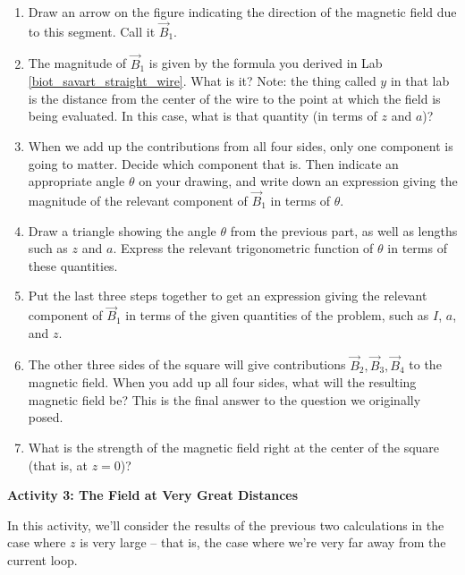 \begin{enumerate}[labparts]

\item Draw an arrow on the figure indicating the 
direction of the magnetic field due to this segment.
Call it $\vec{B}_1$.

\item The magnitude of $\vec{B}_1$ is given by the formula
you derived in Lab \ref{biot_savart_straight_wire}. What is it? Note: the thing
called $y$ in that lab is the distance from the center of
the wire to the point at which the field is being evaluated. 
In this case, what is that quantity (in terms of $z$ and $a$)?
\answerspace{0.7in}

\item When we add up the contributions from all four sides, only
one component is going to matter.  Decide which
component that is. Then indicate an
appropriate angle $\theta$ on your drawing, and 
write down an expression giving
the magnitude of the relevant component of $\vec{B}_1$ in terms of $\theta$.  
\answerspace{0.7in}

\item Draw a triangle showing the angle $\theta$ from the previous part,
as well as lengths such as $z$ and $a$.  Express the relevant trigonometric
function of $\theta$ in terms of these quantities.
\answerspace{0.7in}

\item Put the last three steps together to get an expression giving the
relevant component of $\vec{B}_1$ in terms of the given quantities of the
problem, such as $I$, $a$, and $z$.  
\answerspace{0.7in}

\item \label{answer2}
The other three sides of the square will give contributions
$\vec{B}_2,\vec{B}_3,\vec{B}_4$ to the magnetic field.  When you add
up all four sides, what will the resulting magnetic field be?
This is the final answer to the question we originally posed.
\answerspace{0.7in}

\item What is the strength of the magnetic field right at the
center of the square (that is, at $z=0$)?
\answerspace{0.7in}

\end{enumerate}

\pagebreak[2]
\textbf{Activity 3: The Field at Very Great Distances}

In this activity, we'll consider the results of the previous
two calculations in the case where $z$ is very large -- that is,
the case where we're very far away from the current loop.

